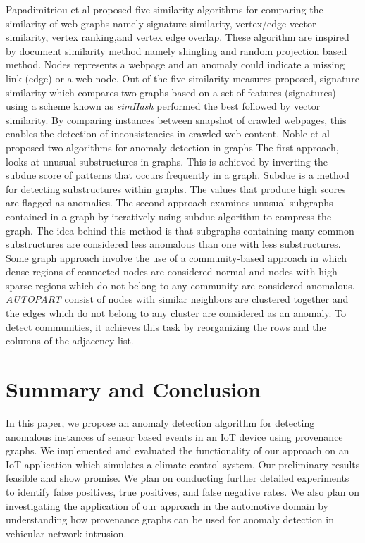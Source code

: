 Papadimitriou et al \cite{Papadimitriou2010} proposed five similarity algorithms for comparing the similarity of web graphs namely signature similarity, vertex/edge vector similarity, vertex ranking,and vertex edge overlap. These algorithm are inspired by document similarity method namely shingling and random projection based method. Nodes represents a webpage and  an anomaly could indicate a missing link (edge) or a web node. Out of the five similarity measures proposed, signature similarity which compares two graphs based on a set of features (signatures) using a scheme known as \textit{simHash} performed the best followed by vector similarity. By comparing instances between snapshot of crawled webpages, this enables the detection of inconsistencies in crawled web content. Noble et al \cite{Noble} proposed two algorithms for anomaly detection in graphs The first approach, looks at unusual substructures in graphs. This is achieved by inverting the subdue score of patterns that occurs frequently in a graph. Subdue is a method for detecting substructures within graphs. The values that produce high scores are flagged as anomalies. The second approach examines unusual subgraphs contained in a graph by iteratively using subdue algorithm to compress the graph. The idea behind this method is that subgraphs containing many common substructures are considered less anomalous than one with less substructures. Some graph approach involve the use of a community-based approach in which dense regions of connected nodes are considered normal and nodes with high sparse regions which do not belong to any community are considered anomalous. \textit{AUTOPART} \cite{chakrabarti2004autopart} consist of nodes with similar neighbors are clustered together and the edges which do not belong to any cluster are considered as an anomaly. To detect communities, it achieves this task by reorganizing the rows and the columns of the adjacency list.



\section{Summary and Conclusion}

In this paper, we propose an anomaly detection algorithm for detecting anomalous instances of sensor based events in an IoT device using provenance graphs. We implemented and evaluated the functionality of our approach on an IoT application which simulates a climate control system.  Our preliminary results feasible and show promise. We plan on conducting further detailed experiments to identify false positives, true positives, and false negative rates. We also plan on investigating the application of our approach in the automotive domain by understanding how provenance graphs can be used for anomaly detection in vehicular network intrusion.




